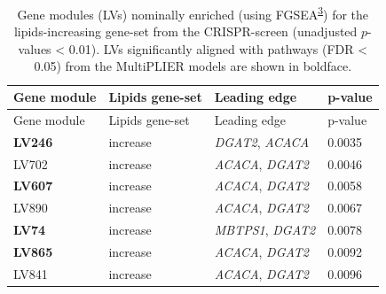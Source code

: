\documentclass[
  a4paper,
]{article}
\newenvironment{tablenos:tagged-table}[1][]{
  \let\oldtablename\tablename
  \renewcommand{\tablename}{Supplementary Table}
}{
  \let\tablename\oldtablename
}
\begin{document}
\begin{tablenos:tagged-table}[S1]

\begin{longtable}[]{@{}llll@{}}
\caption{Gene modules (LVs) nominally enriched (using FGSEA\textsuperscript{\protect\hyperlink{ref-Z8WXLD67}{3}}) for the lipids-increasing gene-set from the CRISPR-screen (unadjusted \(p\)-values \textless{} 0.01).
LVs significantly aligned with pathways (FDR \textless{} 0.05) from the MultiPLIER models are shown in boldface.
\label{tbl:sup:lipids_crispr:modules_enriched_increase}}\label{tbl:sup:lipids_crispr:modules_enriched_increase}\tabularnewline
\toprule()
Gene module & Lipids gene-set & Leading edge & p-value \\
\midrule()
\endfirsthead
\toprule()
Gene module & Lipids gene-set & Leading edge & p-value \\
\midrule()
\endhead
\textbf{LV246} & increase & \emph{DGAT2}, \emph{ACACA} & 0.0035 \\
LV702 & increase & \emph{ACACA}, \emph{DGAT2} & 0.0046 \\
\textbf{LV607} & increase & \emph{ACACA}, \emph{DGAT2} & 0.0058 \\
LV890 & increase & \emph{ACACA}, \emph{DGAT2} & 0.0067 \\
\textbf{LV74} & increase & \emph{MBTPS1}, \emph{DGAT2} & 0.0078 \\
\textbf{LV865} & increase & \emph{ACACA}, \emph{DGAT2} & 0.0092 \\
LV841 & increase & \emph{ACACA}, \emph{DGAT2} & 0.0096 \\
\bottomrule()
\end{longtable}

\end{tablenos:tagged-table}
\end{document}
